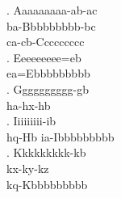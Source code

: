 

\GlossMorphAlign

\ex. \glll Aaaaaaaaa-ab-ac \\
           ba-Bbbbbbbbb-bc \\
           ca-cb-Ccccccccc \\

\ex. \gll Eeeeeeeee=eb \\
          ea=Ebbbbbbbbb \\

\ex. \gll Gggggggggg-gb \\
          {ha-hx}-hb \\

\ex.  Iiiiiiiii-ib \\
          hq-Hb ia-Ibbbbbbbbb \\

\ex. \glll Kkkkkkkkk-kb \\
           kx-ky-kz \\
           kq-Kbbbbbbbbb \\

